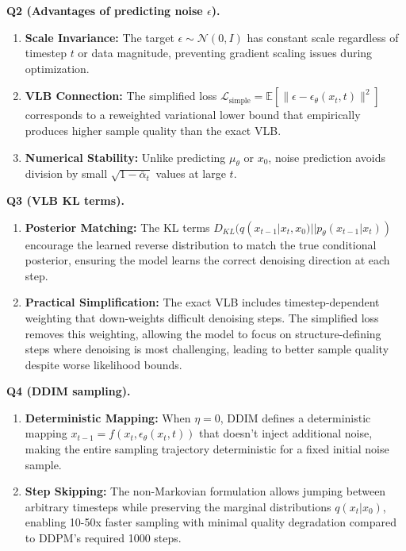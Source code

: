 \documentclass[a4paper,12pt]{article}
\begin{document}
\textbf{Q2 (Advantages of predicting noise $\epsilon$).}
\begin{enumerate}
    \item \textbf{Scale Invariance:} The target $\epsilon \sim \mathcal{N}(0, I)$ has constant scale regardless of timestep $t$ or data magnitude, preventing gradient scaling issues during optimization.
    \item \textbf{VLB Connection:} The simplified loss $\mathcal{L}_{\text{simple}} = \mathbb{E}[\|\epsilon - \epsilon_\theta(x_t, t)\|^2]$ corresponds to a reweighted variational lower bound that empirically produces higher sample quality than the exact VLB.
    \item \textbf{Numerical Stability:} Unlike predicting $\mu_\theta$ or $x_0$, noise prediction avoids division by small $\sqrt{1 - \bar{\alpha}_t}$ values at large $t$.
\end{enumerate}

\textbf{Q3 (VLB KL terms).}
\begin{enumerate}
    \item \textbf{Posterior Matching:} The KL terms $D_{KL}(q(x_{t-1}|x_t, x_0) || p_\theta(x_{t-1}|x_t))$ encourage the learned reverse distribution to match the true conditional posterior, ensuring the model learns the correct denoising direction at each step.
    \item \textbf{Practical Simplification:} The exact VLB includes timestep-dependent weighting that down-weights difficult denoising steps. The simplified loss removes this weighting, allowing the model to focus on structure-defining steps where denoising is most challenging, leading to better sample quality despite worse likelihood bounds.
\end{enumerate}

\textbf{Q4 (DDIM sampling).}
\begin{enumerate}
    \item \textbf{Deterministic Mapping:} When $\eta = 0$, DDIM defines a deterministic mapping $x_{t-1} = f(x_t, \epsilon_\theta(x_t, t))$ that doesn't inject additional noise, making the entire sampling trajectory deterministic for a fixed initial noise sample.
    \item \textbf{Step Skipping:} The non-Markovian formulation allows jumping between arbitrary timesteps while preserving the marginal distributions $q(x_t | x_0)$, enabling 10-50x faster sampling with minimal quality degradation compared to DDPM's required 1000 steps.
\end{enumerate}
\end{document}
